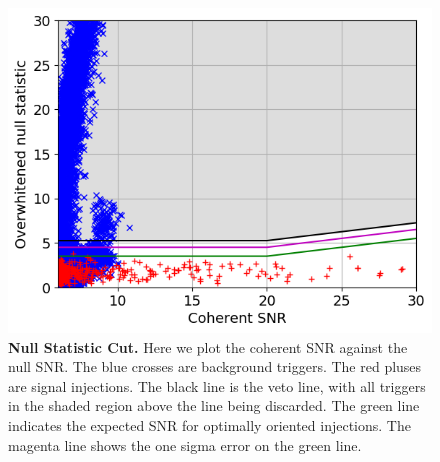 \documentclass[11pt]{cuthesis}
\begin{document}
\begin{figure} %
\begin{center}
\includegraphics[width=0.8\linewidth]{GRB170817A_null_stat2_vs_snr_zoom.png}
\end{center}
\caption{\textbf{Null Statistic Cut.} Here we plot the coherent SNR against the null SNR. The blue crosses are background triggers. The red pluses are signal injections. The black line is the veto line, with all triggers in the shaded region above the line being discarded. The green line indicates the expected SNR for optimally oriented injections. The magenta line shows the one sigma error on the green line. }
\label{fig:nullcut}
\end{figure}
\end{document}
